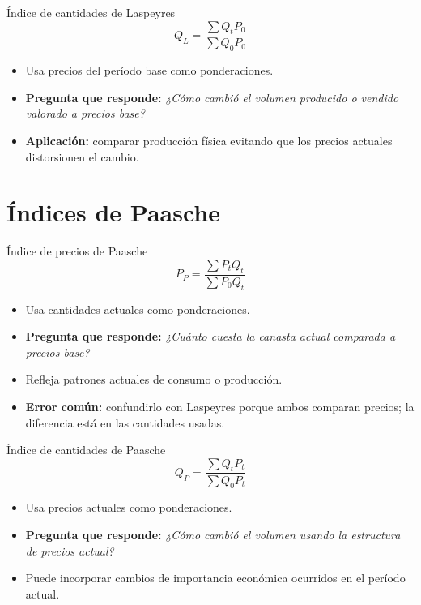 \documentclass[aspectratio=169,11pt]{beamer}
\newcommand{\pregunta}[1]{\textbf{Pregunta que responde:} \emph{#1}}
\newcommand{\errorcomun}[1]{\textbf{Error común:} #1}
\begin{document}
\begin{frame}{Índice de cantidades de Laspeyres}
\[
Q_L=\frac{\sum Q_tP_0}{\sum Q_0P_0}
\]
\begin{itemize}
  \item Usa precios del período base como ponderaciones.
  \item \pregunta{¿Cómo cambió el volumen producido o vendido valorado a precios base?}
  \item \textbf{Aplicación:} comparar producción física evitando que los precios actuales distorsionen el cambio.
\end{itemize}
\end{frame}

\section{Índices de Paasche}

\begin{frame}{Índice de precios de Paasche}
\[
P_P=\frac{\sum P_tQ_t}{\sum P_0Q_t}
\]
\begin{itemize}
  \item Usa cantidades actuales como ponderaciones.
  \item \pregunta{¿Cuánto cuesta la canasta actual comparada a precios base?}
  \item Refleja patrones actuales de consumo o producción.
  \item \errorcomun{confundirlo con Laspeyres porque ambos comparan precios; la diferencia está en las cantidades usadas.}
\end{itemize}
\end{frame}

\begin{frame}{Índice de cantidades de Paasche}
\[
Q_P=\frac{\sum Q_tP_t}{\sum Q_0P_t}
\]
\begin{itemize}
  \item Usa precios actuales como ponderaciones.
  \item \pregunta{¿Cómo cambió el volumen usando la estructura de precios actual?}
  \item Puede incorporar cambios de importancia económica ocurridos en el período actual.
\end{itemize}
\end{frame}
\end{document}
